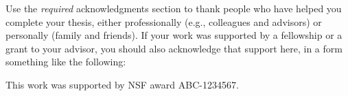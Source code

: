 %
%


\thesistitlepage
      
\thesiscopyrightpage

\begin{singlespace}
\setcounter{page}{2}
\tableofcontents

\cleardoublepage
{}
{}
\listoffigures

\cleardoublepage
{}
{}
\listoftables

%

\end{singlespace}

\begin{thesisacknowledgments}
Use the \emph{required} acknowledgments section to thank people who have helped you complete your thesis, either professionally (e.g., colleagues and advisors) or personally (family and friends).  If your work was supported by a fellowship or a grant to your advisor, you should also acknowledge that support here, in a form something like the following:

This work was supported by NSF award ABC-1234567.
\end{thesisacknowledgments}


